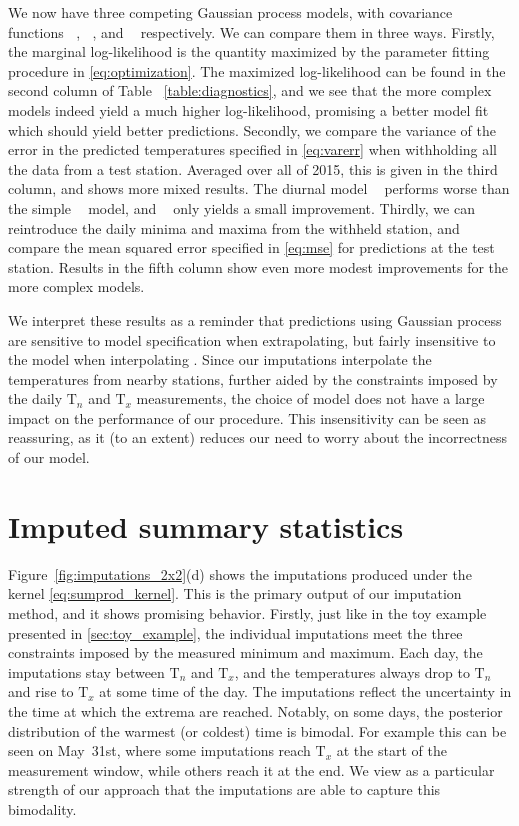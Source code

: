 \documentclass[letter]{article}
\newcommand{\T}{\mathrm{T}}
\newcommand{\Tn}{\T_{n}}
\newcommand{\Tx}{\T_{x}}
\DeclareMathOperator{\kSESE}{k_{\mathtt{SExSE}}}
\DeclareMathOperator{\kdiurn}{k_{\mathtt{SESE_{24}}}}
\DeclareMathOperator{\ksumprod}{k_{\mathtt{sumprod}}}
\renewcommand{\cite}[1]{\citep{#1}}
\begin{document}
We now have three competing Gaussian process models, with covariance functions \(\kSESE\), \(\kdiurn\), and \(\ksumprod\) respectively. We can compare them in three ways. Firstly, the marginal log-likelihood is the quantity maximized by the parameter fitting procedure in \eqref{eq:optimization}. The maximized log-likelihood can be found in the second column of Table~ \ref{table:diagnostics}, and we see that the more complex models indeed yield a much higher log-likelihood, promising a better model fit which should yield better predictions. Secondly, we compare the variance of the error in the predicted temperatures specified in \eqref{eq:varerr} when withholding all the data from a test station. Averaged over all of 2015, this is given in the third column, and shows more mixed results. The diurnal model \(\kdiurn\) performs worse than the simple \(\kSESE\) model, and \(\ksumprod\) only yields a small improvement.
Thirdly, we can reintroduce the daily minima and maxima from the withheld station, and compare the mean squared error specified in \eqref{eq:mse} for predictions at the test station. Results in the fifth column show even more modest improvements for the more complex models.

We interpret these results as a reminder that predictions using Gaussian process are sensitive to model specification when extrapolating, but fairly insensitive to the model when interpolating \cite{stein2012interpolation}. Since our imputations interpolate the temperatures from nearby stations, further aided by the constraints imposed by the daily \(\Tn\) and \(\Tx\) measurements, the choice of model does not have a large impact on the performance of our procedure. This insensitivity can be seen as reassuring, as it (to an extent) reduces our need to worry about the incorrectness of our model.
    


        \section{Imputed summary statistics}\label{imputed-summary-statistics}
    


        Figure~\ref{fig:imputations_2x2}(d) shows the imputations produced under the \(\ksumprod\) kernel \eqref{eq:sumprod_kernel}.
This is the primary output of our imputation method, and it shows promising behavior.
Firstly, just like in the toy example presented in \ref{sec:toy_example}, the individual imputations meet the three constraints imposed by the measured minimum and maximum.
Each day, the imputations stay between \(\Tn\) and \(\Tx\),
and the temperatures always drop to \(\Tn\) and rise to \(\Tx\) at some time of the day.
The imputations reflect the uncertainty in the time at which the extrema are reached.
Notably, on some days, the posterior distribution of the warmest (or coldest) time is bimodal.
For example this can be seen on May~31st, where some imputations reach \(\Tx\) at the start of the measurement window, while others reach it at the end.
We view as a particular strength of our approach that the imputations are able to capture this bimodality.
    
\end{document}
